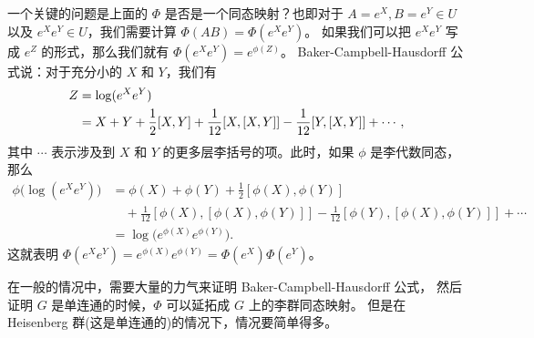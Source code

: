 一个关键的问题是上面的 $\Phi$ 是否是一个同态映射？也即对于 $A=e^X,B=e^Y\in U$
以及 $e^Xe^Y\in U$，我们需要计算 $\Phi(AB)=\Phi(e^Xe^Y)$。
如果我们可以把 $e^Xe^Y$ 写成 $e^Z$ 的形式，那么我们就有 $\Phi(e^Xe^Y)=e^{\phi(Z)}$。
Baker-Campbell-Hausdorff 公式说：对于充分小的 $X$ 和 $Y$，我们有
\begin{align}
  Z&=\log(e^Xe^Y) \notag \\
  &=X+Y+\frac{1}{2}[X,Y]+\frac{1}{12}[X,[X,Y]]-\frac{1}{12}[Y,[X,Y]]+\cdots, \label{BCH}
\end{align}
其中 $\cdots$ 表示涉及到 $X$ 和 $Y$ 的更多层李括号的项。此时，如果 $\phi$
是李代数同态，那么
\begin{align*}
  \phi\bigl(\log(e^Xe^Y)\bigr)&=\phi(X)+\phi(Y)+\frac{1}{2}[\phi(X),\phi(Y)] \\
  &\quad +\frac{1}{12}[\phi(X),[\phi(X),\phi(Y)]]-\frac{1}{12}[\phi(Y),[\phi(X),\phi(Y)]]+\cdots \\
  &=\log\bigl(e^{\phi(X)}e^{\phi(Y)}\bigr).
\end{align*}
这就表明 $\Phi(e^Xe^Y)=e^{\phi(X)}e^{\phi(Y)}=\Phi(e^X)\Phi(e^Y)$。

在一般的情况中，需要大量的力气来证明 Baker-Campbell-Hausdorff 公式，
然后证明 $G$ 是单连通的时候，$\Phi$ 可以延拓成 $G$ 上的李群同态映射。
但是在 Heisenberg 群(这是单连通的)的情况下，情况要简单得多。

